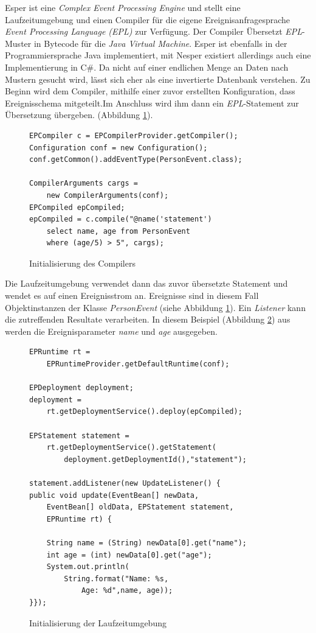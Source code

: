 \documentclass{acm_proc_article-sp}
\begin{document}
Esper ist eine \textit{Complex Event Processing Engine} und stellt eine Laufzeitumgebung 
und einen Compiler für die eigene Ereignisanfragesprache \textit{Event Processing 
Language (EPL)} zur Verfügung. Der Compiler Übersetzt \textit{EPL}-Muster in Bytecode für 
die 
\textit{Java Virtual Machine}. Esper ist ebenfalls in der Programmiersprache Java 
implementiert, mit Nesper existiert allerdings auch eine Implementierung in C\#. Da nicht 
auf einer endlichen Menge an Daten nach Mustern gesucht wird, lässt sich eher als 
eine invertierte Datenbank verstehen. Zu Beginn wird dem Compiler, mithilfe einer 
zuvor erstellten Konfiguration, dass Ereignisschema mitgeteilt.Im Anschluss wird ihm dann 
ein \textit{EPL}-Statement zur Übersetzung übergeben. (Abbildung 
\ref{java:01}). 

\begin{figure}[H]    
\begin{verbatim}
EPCompiler c = EPCompilerProvider.getCompiler();
Configuration conf = new Configuration();
conf.getCommon().addEventType(PersonEvent.class);

CompilerArguments cargs = 
    new CompilerArguments(conf);
EPCompiled epCompiled;
epCompiled = c.compile("@name('statement')
    select name, age from PersonEvent
    where (age/5) > 5", cargs);
\end{verbatim}
\caption{Initialisierung des Compilers}
\label{java:01}
\end{figure}

Die Laufzeitumgebung verwendet dann das zuvor übersetzte Statement und wendet es auf 
einen Ereignisstrom an. Ereignisse sind in diesem Fall Objektinstanzen der Klasse 
\emph{PersonEvent} (siehe Abbildung \ref{java:01}). Ein \textit{Listener} kann die 
zutreffenden Resultate verarbeiten. In 
diesem Beispiel (Abbildung \ref{java:02}) aus \cite{esper-reference} werden die 
Ereignisparameter \textit{name} und \textit{age} ausgegeben.

\begin{figure}[H]    
\begin{verbatim}
EPRuntime rt =
    EPRuntimeProvider.getDefaultRuntime(conf);
    
EPDeployment deployment;
deployment =
    rt.getDeploymentService().deploy(epCompiled);
    
EPStatement statement =         
    rt.getDeploymentService().getStatement(
        deployment.getDeploymentId(),"statement");
        
statement.addListener(new UpdateListener() {
public void update(EventBean[] newData,
    EventBean[] oldData, EPStatement statement,
    EPRuntime rt) {
    
    String name = (String) newData[0].get("name");
    int age = (int) newData[0].get("age");
    System.out.println(
        String.format("Name: %s,
            Age: %d",name, age));
}});
\end{verbatim}
    \caption{Initialisierung der Laufzeitumgebung}
    \label{java:02}
\end{figure}
\end{document}
